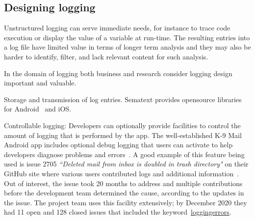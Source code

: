 \subsection{Designing logging}
Unstructured logging can serve immediate needs, for instance to trace code execution or display the value of a variable at run-time. The resulting entries into a log file have limited value in terms of longer term analysis and they may also be harder to identify, filter, and lack relevant content for such analysis.

In the domain of logging both business and research consider logging design important and valuable. 

Storage and transmission of log entries. Sematext provides opensource libraries for Android~\citep{github2020_sematext_logsene_android} and iOS.

Controllable logging: Developers can optionally provide facilities to control the amount of logging that is performed by the app. The well-established K-9 Mail Android app includes optional debug logging that users can activate to help developers diagnose problems and errors~\citep{github2020_k9mail_logging_errors}. A good example of this feature being used is issue 2705 \emph{``Deleted mail from inbox is doubled in trash directory"} on their GitHub site where various users contributed logs and additional information~\citep{github2017_k9mail_issue_2705}. Out of interest, the issue took 20 months to address and multiple contributions before the development team determined the cause, according to the updates in the issue. The project team uses this facility extensively; by  December 2020 they had 11 open and 128 closed issues that included the keyword~\href{https://github.com/k9mail/k-9/issues?utf8=\%E2\%9C\%93\&q=is\%3Aissue\%20is\%3Aopen\%20loggingerrors\%20}{loggingerrors}.

